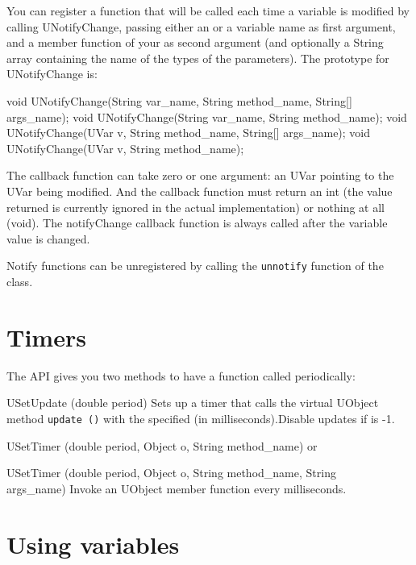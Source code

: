 You can register a function that will be called each time a variable is
modified by calling UNotifyChange, passing either an \UVar or a variable
name as first argument, and a member function of your \UObject as second
argument (and optionally a String array containing the name of the types of
the parameters). The prototype for UNotifyChange is:

\begin{java}
void UNotifyChange(String var_name, String method_name, String[] args_name);
void UNotifyChange(String var_name, String method_name);
void UNotifyChange(UVar v, String method_name, String[] args_name);
void UNotifyChange(UVar v, String method_name);
\end{java}

The callback function can take zero or one argument: an UVar pointing to the
UVar being modified. And the callback function must return an int (the value
returned is currently ignored in the actual implementation) or nothing at
all (void).  The notifyChange callback function is always called after the
variable value is changed.

Notify functions can be unregistered by calling the \lstinline|unnotify|
function of the \UVar class.

\section{Timers}
\label{sec:uob:apijava:timers}

The API gives you two methods to have a function called periodically:

\begin{cxxapi}
\item[USetUpdate (double period)] Sets up a timer that calls the virtual
  UObject method \lstinline{update ()} with the specified  (in
  milliseconds).Disable updates if  is -1.
\item[USetTimer (double period, Object o, String method\_name)] or
\item[USetTimer (double period, Object o, String method\_name, String\[\]
  args\_name)] Invoke an UObject member function  every
   milliseconds.
\end{cxxapi}


\section{Using \urbi variables}
\label{sec:uob:apijava:uvar}

